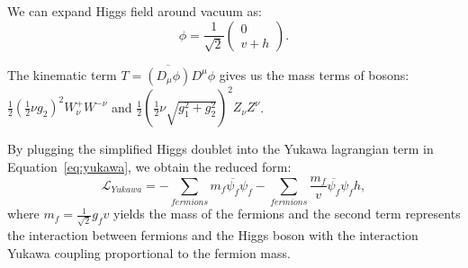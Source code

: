 \par We can expand Higgs field around vacuum as:
\begin{equation}
  \phi=\frac{1}{\sqrt{2}}\left( \begin{smallmatrix} 0\\v + h \end{smallmatrix}\right).
\end{equation}

\par The kinematic term $T=\overline{\left(D_\mu\phi\right)}D^\mu\phi $ gives us the mass terms of bosons:
 $\frac{1}{2}(\frac{1}{2}\nu g_2)^2 W_\nu^+ W^{-\nu}$ and $\frac{1}{2}(\frac{1}{2}\nu \sqrt{g_1^2+g_2^2})^2 Z_\nu Z^\nu$.\\

\par By plugging the simplified Higgs doublet into the Yukawa lagrangian term in Equation~\ref{eq:yukawa}, we obtain the reduced form:
\begin{equation}
  \mathcal{L}_{Yukawa} = - \sum_{fermions} m_f \overline{\psi_f}\psi_f - \sum_{fermions} \frac{m_f}{v} \overline{\psi_f}\psi_f h,
  \label{eq:vac}
\end{equation}
where $m_f=\frac{1}{\sqrt{2}} g_f v $ yields the mass of the fermions and the second term represents the interaction between fermions and the Higgs boson with the interaction Yukawa coupling proportional to the fermion mass.

